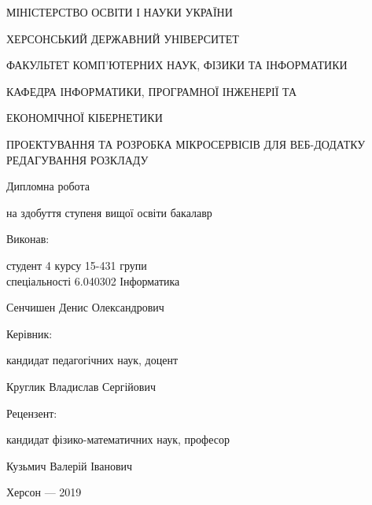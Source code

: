 \thispagestyle{empty}

{\centering
МІНІСТЕРСТВО ОСВІТИ І НАУКИ УКРАЇНИ

ХЕРСОНСЬКИЙ ДЕРЖАВНИЙ УНІВЕРСИТЕТ

ФАКУЛЬТЕТ КОМП'ЮТЕРНИХ НАУК, ФІЗИКИ ТА ІНФОРМАТИКИ

КАФЕДРА ІНФОРМАТИКИ, ПРОГРАМНОЇ ІНЖЕНЕРІЇ ТА 

ЕКОНОМІЧНОЇ КІБЕРНЕТИКИ

\vfill

ПРОЕКТУВАННЯ ТА РОЗРОБКА МІКРОСЕРВІСІВ ДЛЯ ВЕБ-ДОДАТКУ РЕДАГУВАННЯ РОЗКЛАДУ

Дипломна робота

на здобуття ступеня вищої освіти бакалавр

}

\vfill

\hfill\begin{minipage}[t]{0.65\textwidth}
Виконав: 

студент 4 курсу 15-431 групи \\ спеціальності 6.040302  Інформатика

Сенчишен Денис Олександрович

Керівник:

кандидат педагогічних наук, доцент

Круглик Владислав Сергійович

Рецензент:

кандидат фізико-математичних наук, професор

Кузьмич Валерій Іванович

\end{minipage}

\vfill

{\centering
Херсон --- 2019

}